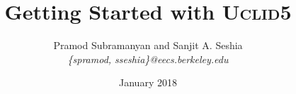 \documentclass[oneside]{scrbook}
\newcommand{\uclid}{{\textsc{Uclid5}}\xspace}
\begin{document}
\title{Getting Started with {\uclid}}
\author{Pramod Subramanyan and Sanjit A. Seshia \\
        \textit{\{spramod, sseshia\}@eecs.berkeley.edu}}
\date{January 2018}
\maketitle

\tableofcontents
\listofuclidlisting









\appendix

\end{document}

